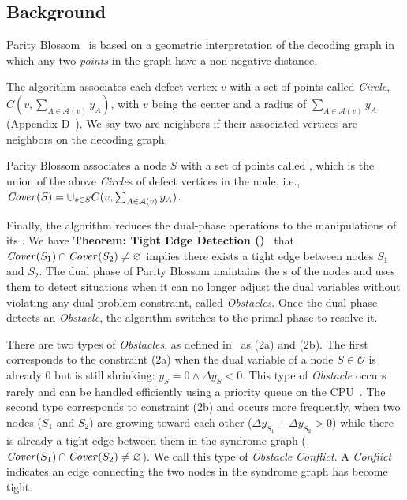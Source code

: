 \subsection{Background}
\label{sec:background-parity}

Parity Blossom~\cite{wu2023qce} is based on a geometric interpretation of the decoding graph in which any two \emph{points} in the graph have a non-negative distance.

The algorithm associates each defect vertex $v$ with a set of points called \emph{Circle}, $C(v,\sum_{A \in \mathcal{A}(v)} y_A)$, with $v$ being the center and a radius of $\sum_{A \in \mathcal{A}(v)} y_A$ (Appendix D~\cite{wu2023qce}).
We say two \covs are neighbors if their associated vertices are neighbors on the decoding graph.

Parity Blossom associates a node $S$ with a set of points called \cov, which is the union of the above \emph{Circle}s of defect vertices in the node, i.e., $\text{\textit{Cover}}(S)=\cup_{v\in S} C(v,\sum_{A \in \mathcal{A}(v)} y_A)$.

Finally, the algorithm reduces the dual-phase operations to the manipulations of its \covs.
We have \textbf{Theorem: Tight Edge Detection (\cov)}~\cite{wu2023qce} that  $\text{\textit{Cover}}(S_1) \cap \text{\textit{Cover}}(S_2) \neq \varnothing$ implies there exists a tight edge between nodes $S_1$ and $S_2$.
The dual phase of Parity Blossom maintains the \emph{\cov}s of the nodes and uses them to detect situations when it can no longer adjust the dual variables without violating any dual problem constraint, called \emph{Obstacles}.
Once the dual phase detects an \emph{Obstacle}, the algorithm switches to the primal phase to resolve it.

There are two types of \emph{Obstacles}, as defined in~\cite{wu2023qce} as (2a) and (2b).
The first corresponds to the constraint (2a) when the dual variable of a node $S \in \mathcal{O}$ is already 0 but is still shrinking: $y_S = 0 \land \Delta y_S < 0$.
This type of \emph{Obstacle} occurs rarely and can be handled efficiently using a priority queue on the CPU~\cite{kolmogorov2009blossom,higgott2025sparse}.
The second type corresponds to constraint (2b) and occurs more frequently, when two nodes ($S_1$ and $S_2$) are growing toward each other ($\Delta y_{S_1} + \Delta y_{S_2} > 0$) while there is already a tight edge between them in the syndrome graph ($\text{\textit{Cover}}(S_1) \cap \text{\textit{Cover}}(S_2) \neq \varnothing$).
We call this type of \emph{Obstacle}  \emph{Conflict}.
A \emph{Conflict} indicates an edge connecting the two nodes in the syndrome graph has become tight. 

